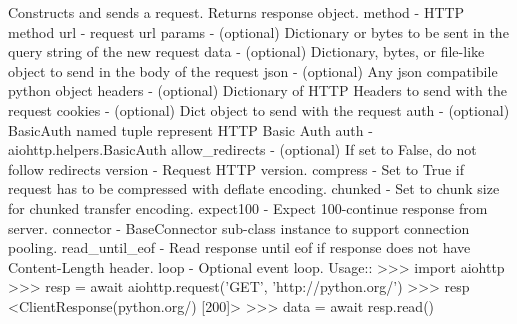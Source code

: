 \begin{DoxyVerb}Constructs and sends a request. Returns response object.
method - HTTP method
url - request url
params - (optional) Dictionary or bytes to be sent in the query
  string of the new request
data - (optional) Dictionary, bytes, or file-like object to
  send in the body of the request
json - (optional) Any json compatibile python object
headers - (optional) Dictionary of HTTP Headers to send with
  the request
cookies - (optional) Dict object to send with the request
auth - (optional) BasicAuth named tuple represent HTTP Basic Auth
auth - aiohttp.helpers.BasicAuth
allow_redirects - (optional) If set to False, do not follow
  redirects
version - Request HTTP version.
compress - Set to True if request has to be compressed
   with deflate encoding.
chunked - Set to chunk size for chunked transfer encoding.
expect100 - Expect 100-continue response from server.
connector - BaseConnector sub-class instance to support
   connection pooling.
read_until_eof - Read response until eof if response
   does not have Content-Length header.
loop - Optional event loop.
Usage::
  >>> import aiohttp
  >>> resp = await aiohttp.request('GET', 'http://python.org/')
  >>> resp
  <ClientResponse(python.org/) [200]>
  >>> data = await resp.read()
\end{DoxyVerb}
 